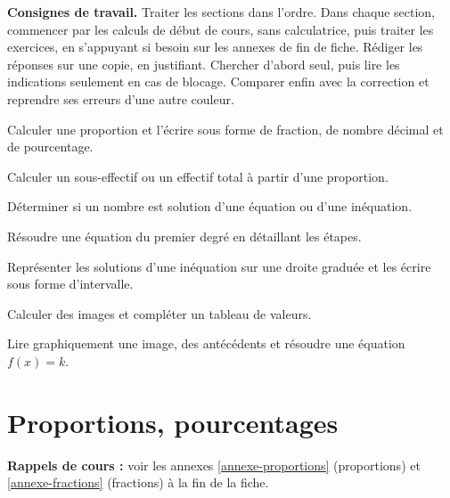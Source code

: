 \documentclass[10pt,a4paper]{article}
\begin{document}

\textbf{Consignes de travail.} Traiter les sections dans l'ordre. Dans chaque section, commencer par les calculs de début de cours, sans calculatrice, puis traiter les exercices, en s'appuyant si besoin sur les annexes de fin de fiche. Rédiger les réponses sur une copie, en justifiant. Chercher d'abord seul, puis lire les indications seulement en cas de blocage. Comparer enfin avec la correction et reprendre ses erreurs d'une autre couleur.

\medskip

\begin{objectifs}
Calculer une proportion et l'écrire sous forme de fraction, de nombre décimal et de pourcentage.\par\smallskip
Calculer un sous-effectif ou un effectif total à partir d'une proportion.\par\smallskip
Déterminer si un nombre est solution d'une équation ou d'une inéquation.\par\smallskip
Résoudre une équation du premier degré en détaillant les étapes.\par\smallskip
Représenter les solutions d'une inéquation sur une droite graduée et les écrire sous forme d'intervalle.\par\smallskip
Calculer des images et compléter un tableau de valeurs.\par\smallskip
Lire graphiquement une image, des antécédents et résoudre une équation \(f(x)=k\).
\end{objectifs}


\section{Proportions, pourcentages}

\textbf{Rappels de cours :} voir les annexes \ref{annexe-proportions} (proportions) et \ref{annexe-fractions} (fractions) à la fin de la fiche.
\nopagebreak
\end{document}
